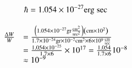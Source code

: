 \documentclass[a4paper,14pt]{book}
\begin{document}
\begin{equation}
\hbar = 1.054 \times 10^{-27} {\rm erg \; sec}
\end{equation}

\begin{equation}
\begin{array}{rl}
\frac{\Delta W}{W} &= \frac{\left( 1.054 \times 10^{-27} {\rm gr} \frac{{\rm cm^2}}{{\rm sec^2}} \right) \left( {\rm cm} \times 10^2 \right)}{1.7 \times 10^{-24} {\rm gr} \times 10^{-2} {\rm cm^2} \times 6 \times 10^9 \frac{{\rm cm}}{{\rm sec}}} \\
&= \frac{1.054 \times 10^{-25}}{1.7 \times 6} \times 10^{17} = \frac{1.054}{1.7 \times 6} 10^{-8} \\
&\approx 10^{-9}
\end{array}
\end{equation}
\end{document}
